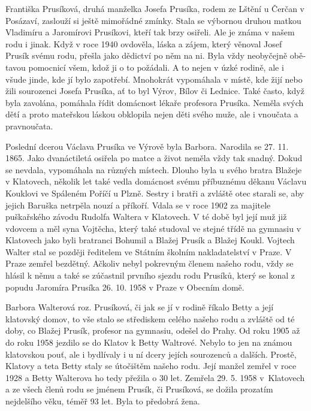 \documentclass[../dejiny-rodu-prusiku.tex]{subfiles}
\begin{document}
Františka Prusíková, druhá manželka Josefa Prusíka, rodem ze Lštění u Čerčan v Posázaví, zaslouží si ještě mimo­řádné zmínky. Stala se výbornou druhou matkou Vladimíru a Jaromírovi Prusíkovi, kteří tak brzy osiřeli. Ale je známa v našem rodu i jinak. Když v roce 1940 ovdověla, láska a zájem, který věnoval Josef Prusík svému rodu, přešla jako dědictví po něm na ni. Byla vždy neobyčejně obě­tavou pomocnicí všem, kdož ji o to požádali. A to nejen v úzké rodině, ale i všude jinde, kde jí bylo zapotřebí. Mnohokrát vypomáhala v místě, kde žijí nebo žili sourozenci Josefa Prusíka, ať to byl Výrov, Bílov či Lednice. Také často, když byla zavolána, pomáhala řídit domácnost lékaře profesora Prusíka. Neměla svých dětí a proto mateřskou láskou obklopila nejen děti svého muže, ale i vnoučata a pravnoučata.

Poslední dcerou Václava Prusíka ve Výrově byla Barbora. Narodila se 27. 11. 1865. Jako dvanáctiletá osiřela po matce a život neměla vždy tak snadný. Dokud se nevdala, vypomáhala na různých místech. Dlouho byla u svého bratra Blažeje v Klatovech, několik let také vedla do­mácnost svému příbuznému děkanu Václavu Kouklovi ve Spá­leném Poříčí u Plzně. Sestry i bratři a zvláště otec starali se, aby jejich Baruška netrpěla nouzí a příkoří. Vdala se v roce 1902 za majitele puškařského závo­du Rudolfa Waltera v Klatovech. V té době byl její muž již vdovcem a měl syna Vojtěcha, který také studoval ve stejné třídě na gymnasiu v Klatovech jako byli bratranci Bohumil a Blažej Prusík a Blažej Koukl. Vojtech Walter stal se později ředitelem ve Státním školním na­kladatelství v Praze. V Praze zemřel bezdětný. Ačkoliv nebyl pokrevným členem našeho rodu, vždy se hlásil k němu a také se zúčastnil prvního sjezdu rodu Prusíků, který se konal z popudu Jaromíra Prusíka 26. 10. 1958 v Praze v Obecním domě.

Barbora Walterová roz. Prusíková, či jak se jí v ro­dině říkalo Betty a její klatovský domov, to vše stalo se střediskem celého našeho rodu a zvláště od té doby, co Blažej Prusík, profesor na gymnasiu, odešel do Prahy. Od roku 1905 až do roku 1958 jezdilo se do Klatov k Betty Waltrové. Nebylo to jen na známou klatovskou pouť, ale i bydlívaly i u ní dcery jejích sourozenců a dalších. Prostě, Klatovy a teta Betty staly se útočištěm našeho rodu. Její manžel zemřel v roce 1928 a Betty Walterova ho tedy přežila o 30 let. Zemřela 29. 5. 1958 v Klatovech a ze všech členů rodu se jménem Prusík, či Prusíková, se dožila prozatím nejdelšího věku, téměř 93 let. Byla to předobrá žena.
\end{document}
